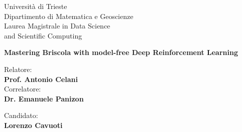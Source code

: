 \begin{titlepage}
    \begin{figure}
        \centering
        
    \end{figure}

    \begin{center}
        \LARGE{Università di Trieste\\}
        \vspace{5mm}
        \LARGE{Dipartimento di Matematica e Geoscienze\\}
        \vspace{5mm}
        \LARGE{Laurea Magistrale in Data Science \\ and Scientific Computing\\}

        \vspace{15mm}
         \huge{\bf Mastering Briscola with model-free Deep Reinforcement Learning}

        \vspace{15mm}

    \end{center}

    \vspace{5mm}

    \begin{minipage}{0.47\textwidth}
        {\large{Relatore:}
            {\normalsize\vspace{3mm} \bf\\ \large{Prof. Antonio Celani}}}
        {\vspace{3mm} \large{\\Correlatore:}
            {\normalsize\vspace{3mm} \bf\\ \large{Dr. Emanuele Panizon}}}
    \end{minipage}
    \hfill
    \begin{minipage}{0.47\textwidth}\raggedleft
        {\large{Candidato:}{\normalsize\vspace{3mm} \bf\\ \large{Lorenzo Cavuoti}}}
    \end{minipage}

    \vspace{15mm}
\end{titlepage}